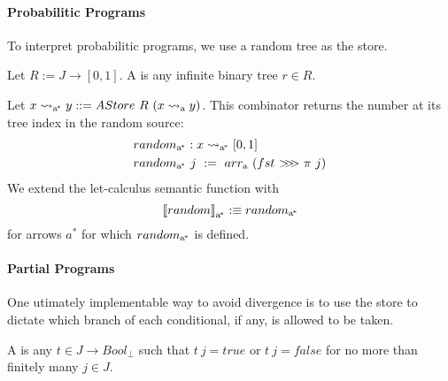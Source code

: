 \documentclass[preprint]{sigplanconf}
\newcommand{\arrow}{\rightsquigarrow}
\newcommand{\arrowarr}{\ensuremath{arr}}
\newcommand{\arrowcomp}{\ensuremath{{>}\mspace{-6mu}{>}\mspace{-6mu}{>}}}
\newcommand{\gen}{_\mathrm{a}}
\newcommand{\genc}{_\mathrm{a^{\mspace{-2mu}*}}}
\begin{document}
\paragraph{Probabilitic Programs} To interpret probabilitic programs, we use a random tree as the store.

\begin{definition}
Let $R := J \to [0,1]$.
A  is any infinite binary tree $r \in R$.
\end{definition}

Let $x \arrow\genc y ::= AStore~R~(x \arrow\gen y)$.
This combinator returns the number at its tree index in the random source:
\begin{equation}
\begin{aligned}
	&random\genc : x \arrow\genc [0,1] \\
	&random\genc~j \ := \ \arrowarr\gen~(fst~\arrowcomp~\pi~j)
\end{aligned}
\end{equation}
We extend the let-calculus semantic function with
\begin{equation}
	\meaningof{random}\genc :\equiv random\genc
\end{equation}
for arrows $a^*$ for which $random\genc$ is defined.

\paragraph{Partial Programs}

One utimately implementable way to avoid divergence is to use the store to dictate which branch of each conditional, if any, is allowed to be taken.

\begin{definition}
A  is any $t \in J \to Bool_\bot$ such that $t~j = true$ or $t~j = false$ for no more than finitely many $j \in J$.
\end{definition}
\end{document}
